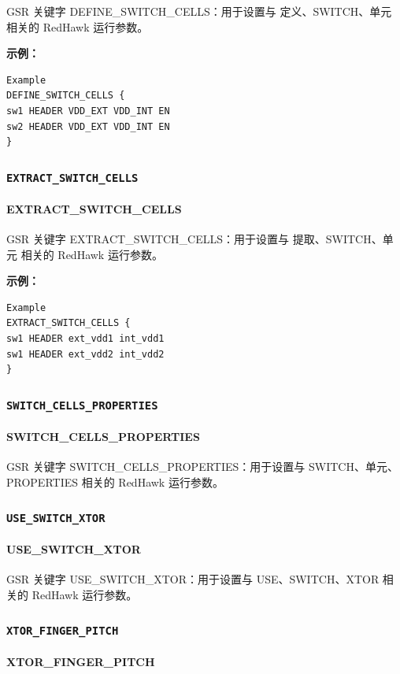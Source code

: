 GSR 关键字 DEFINE_SWITCH_CELLS：用于设置与 定义、SWITCH、单元 相关的 RedHawk 运行参数。

\textbf{示例：}
\begin{lstlisting}
Example
DEFINE_SWITCH_CELLS {
sw1 HEADER VDD_EXT VDD_INT EN
sw2 HEADER VDD_EXT VDD_INT EN
}
\end{lstlisting}

\subsubsection{\texttt{EXTRACT_SWITCH_CELLS}}
\paragraph*{EXTRACT_SWITCH_CELLS}

GSR 关键字 EXTRACT_SWITCH_CELLS：用于设置与 提取、SWITCH、单元 相关的 RedHawk 运行参数。

\textbf{示例：}
\begin{lstlisting}
Example
EXTRACT_SWITCH_CELLS {
sw1 HEADER ext_vdd1 int_vdd1
sw1 HEADER ext_vdd2 int_vdd2
}
\end{lstlisting}

\subsubsection{\texttt{SWITCH_CELLS_PROPERTIES}}
\paragraph*{SWITCH_CELLS_PROPERTIES}

GSR 关键字 SWITCH_CELLS_PROPERTIES：用于设置与 SWITCH、单元、PROPERTIES 相关的 RedHawk 运行参数。

\subsubsection{\texttt{USE_SWITCH_XTOR}}
\paragraph*{USE_SWITCH_XTOR}

GSR 关键字 USE_SWITCH_XTOR：用于设置与 USE、SWITCH、XTOR 相关的 RedHawk 运行参数。

\subsubsection{\texttt{XTOR_FINGER_PITCH}}
\paragraph*{XTOR_FINGER_PITCH}

